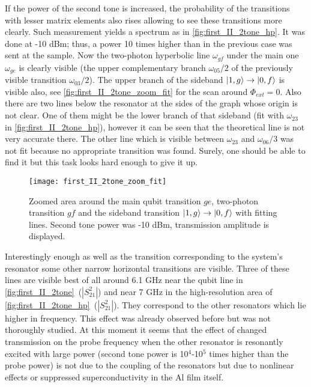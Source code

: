 \documentclass[12pt, twoside]{report}
\DeclarePairedDelimiter\ket{\lvert}{\rangle}
\numberwithin{equation}{section}
\begin{document}
If the power of the second tone is increased, the probability of the transitions with lesser matrix elements also rises allowing to see these transitions more clearly. Such measurement yields a spectrum as in \autoref{fig:first_II_2tone_hp}. It was done at -10 dBm; thus, a power 10 times higher than in the previous case was sent at the sample. Now the two-photon hyperbolic line $\omega_{gf}$ under the main one $\omega_{ge}$ is clearly visible (the upper complementary branch $\omega_{05}/2$ of the previously visible transition $\omega_{03}/2$). The upper branch of the sideband $\ket{1,g}\rightarrow \ket{0,f}$ is visible also, see \autoref{fig:first_II_2tone_zoom_fit} for the scan around $\Phi_{ext}=0$. Also there are two lines below the resonator at the sides of the graph whose origin is not clear. One of them might be the lower branch of that sideband (fit with $\omega_{23}$ in \autoref{fig:first_II_2tone_hp}), however it can be seen that the theoretical line is not very accurate there. The other line which is visible between $\omega_{23}$ and $\omega_{06}/3$ was not fit because no appropriate transition was found. Surely, one should be able to find it but this task looks hard enough to give it up.

	
\begin{figure}
\centering
\texttt{[image: first\_II\_2tone\_zoom\_fit]}
\caption{Zoomed area around the main qubit transition $ge$, two-photon transition $gf$ and the sideband transition $\ket{1,g}\rightarrow \ket{0,f}$ with fitting lines. Second tone power was -10 dBm, transmission amplitude is displayed.}
\label{fig:first_II_2tone_zoom_fit}
\end{figure}

Interestingly enough as well as the transition corresponding to the system's resonator some other narrow horizontal transitions are visible. Three of these lines are visible best of all around 6.1 GHz near the qubit line in \autoref{fig:first_II_2tone}~($|S^2_{21}|$) and near 7 GHz in the high-resolution area of \autoref{fig:first_II_2tone_hp}~($|S^2_{21}|$). They correspond to the other resonators which lie higher in frequency. This effect was already observed before but was not thoroughly studied. At this moment it seems that the effect of changed transmission on the probe frequency when the other resonator is resonantly excited with large power (second tone power is 10$^4$-10$^5$ times higher than the probe power) is not due to the coupling of the resonators but due to nonlinear effects or suppressed superconductivity in the Al film itself.
\end{document}
